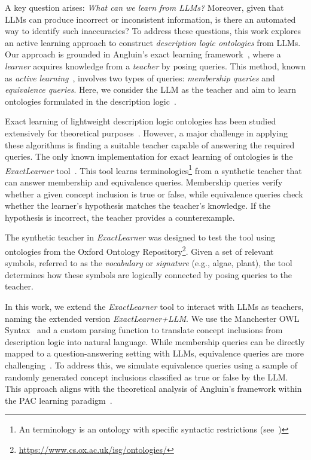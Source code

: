 %
A key question arises: \emph{What can we learn from \glspl{LLM}?}
%
Moreover, given that \glspl{LLM} can produce incorrect or inconsistent information, is there an automated way to identify such inaccuracies?
%
To address these questions, this work explores an active learning approach to construct \emph{description logic ontologies} from \glspl{LLM}.
%
Our approach is grounded in Angluin's exact learning framework~\cite{DBLP:journals/ml/Angluin87}, where a \emph{learner} acquires knowledge from a \emph{teacher} by posing queries.
%
This method, known as \emph{active learning}~\cite{DBLP:conf/stoc/Angluin92}, involves two types of queries: \emph{membership queries} and \emph{equivalence queries}.
%
Here, we consider the \gls{LLM} as the teacher and aim to learn ontologies formulated in the \EL description logic~\cite{DBLP:conf/ijcai/BaaderBL05}.

%
Exact learning of lightweight description logic ontologies has been studied extensively for theoretical purposes~\cite{DBLP:conf/ijcai/FunkJLPW19,DBLP:conf/ijcai/FunkJL21,DBLP:conf/aaai/KonevOW16,DBLP:journals/jmlr/KonevLOW17,DBLP:conf/dlog/OzakiPM20}.
%
However, a major challenge in applying these algorithms is finding a suitable teacher capable of answering the required queries.
%
The only known implementation for exact learning of \EL ontologies is the \emph{ExactLearner} tool~\cite{DBLP:conf/kr/DuarteKO18}.
%
This tool learns \EL terminologies\footnote{An \EL terminology is an ontology with specific syntactic restrictions (see~)} from a synthetic teacher that can answer membership and equivalence queries.
%
Membership queries verify whether a given concept inclusion is true or false, while equivalence queries check whether the learner's hypothesis matches the teacher's knowledge.
%
If the hypothesis is incorrect, the teacher provides a counterexample.

%
The synthetic teacher in \emph{ExactLearner} was designed to test the tool using ontologies from the Oxford Ontology Repository\footnote{\url{https://www.cs.ox.ac.uk/isg/ontologies/}}.
%
Given a set of relevant symbols, referred to as the \emph{vocabulary} or \emph{signature} (e.g., algae, plant), the tool determines how these symbols are logically connected by posing queries to the teacher.

%
In this work, we extend the \emph{ExactLearner} tool to interact with \glspl{LLM} as teachers, naming the extended version \emph{ExactLearner+LLM}.
%
We use the Manchester OWL Syntax~\cite{DBLP:conf/owled/HorridgeDGRSW06} and a custom parsing function to translate concept inclusions from description logic into natural language.
%
While membership queries can be directly mapped to a question-answering setting with \glspl{LLM}, equivalence queries are more challenging~\cite{DBLP:journals/ml/WeissGY24,DBLP:journals/ijar/BlumKOT24}.
%
To address this, we simulate equivalence queries using a sample of randomly generated concept inclusions classified as true or false by the \gls{LLM}.
%
This approach aligns with the theoretical analysis of Angluin's framework within the \gls{PAC} learning paradigm~\cite{DBLP:journals/ml/Angluin87}.

